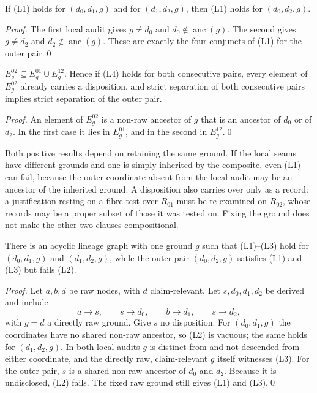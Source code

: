 \documentclass[twocolumn,envcountsect,envcountsame,natbib]{svjour3}
\begin{document}
\begin{proposition}\label{ex:prop:l1-compose}
If (L1) holds for $(d_0,d_1,g)$ and for $(d_1,d_2,g)$, then (L1) holds for $(d_0,d_2,g)$.
\end{proposition}
\begin{proof}
The first local audit gives $g\neq d_0$ and $d_0\notin\operatorname{anc}(g)$. The second gives $g\neq d_2$ and $d_2\notin\operatorname{anc}(g)$. These are exactly the four conjuncts of (L1) for the outer pair.\qed
\end{proof}

\begin{proposition}\label{ex:prop:l4-compose}
$E^{02}_g\subseteq E^{01}_g\cup E^{12}_g$. Hence if (L4) holds for both consecutive pairs, every element of $E^{02}_g$ already carries a disposition, and strict separation of both consecutive pairs implies strict separation of the outer pair.
\end{proposition}
\begin{proof}
An element of $E^{02}_g$ is a non-raw ancestor of $g$ that is an ancestor of $d_0$ or of $d_2$. In the first case it lies in $E^{01}_g$, and in the second in $E^{12}_g$.\qed
\end{proof}

Both positive results depend on retaining the same ground. If the local seams have different grounds and one is simply inherited by the composite, even (L1) can fail, because the outer coordinate absent from the local audit may be an ancestor of the inherited ground. A disposition also carries over only as a record: a justification resting on a fibre test over $R_{01}$ must be re-examined on $R_{02}$, whose records may be a proper subset of those it was tested on. Fixing the ground does not make the other two clauses compositional.

\begin{proposition}\label{ex:prop:l2-noncompose}
There is an acyclic lineage graph with one ground $g$ such that (L1)--(L3) hold for $(d_0,d_1,g)$ and $(d_1,d_2,g)$, while the outer pair $(d_0,d_2,g)$ satisfies (L1) and (L3) but fails (L2).
\end{proposition}
\begin{proof}
Let $a,b,d$ be raw nodes, with $d$ claim-relevant. Let $s,d_0,d_1,d_2$ be derived and include
\[
a\to s,\qquad s\to d_0,\qquad b\to d_1,\qquad s\to d_2,
\]
with $g=d$ a directly raw ground. Give $s$ no disposition. For $(d_0,d_1,g)$ the coordinates have no shared non-raw ancestor, so (L2) is vacuous; the same holds for $(d_1,d_2,g)$. In both local audits $g$ is distinct from and not descended from either coordinate, and the directly raw, claim-relevant $g$ itself witnesses (L3). For the outer pair, $s$ is a shared non-raw ancestor of $d_0$ and $d_2$. Because it is undisclosed, (L2) fails. The fixed raw ground still gives (L1) and (L3).\qed
\end{proof}
\end{document}
